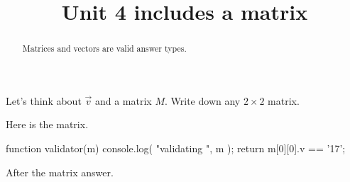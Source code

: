 \documentclass{ximera}
\title{Unit 4 includes a matrix}
\begin{document}
\begin{abstract}
  Matrices and vectors are valid answer types.
\end{abstract}

\begin{exercise}
  Let's think about $\vec{v}$ and a matrix $M$.  Write down any $2
  \times 2$ matrix.

\begin{solution}
  Here is the matrix.

\begin{matrix-answer}[name=M]
  function validator(m) {
    console.log( "validating ", m );
    return m[0][0].v == '17';
  }
\end{matrix-answer}

After the matrix answer.

\end{solution}

\end{exercise}
\end{document}
